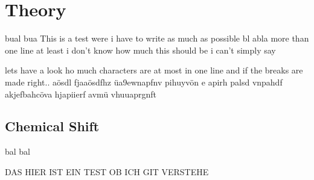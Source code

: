 \section{Theory}
bual bua This is a test were i have to write as much as possible bl abla more than one line at least i don't know how much this should be i can't simply say 

lets have a look ho much characters are at most in one line and if the breaks are made right.. aösdl fjaaösdfhz üa9ewnapfnv pihuyvön e apirh palsd vnpahdf akjefbahcöva hjapiierf avmü vhuuaprgnft 

\subsection{Chemical Shift}
bal bal 

DAS HIER IST EIN TEST OB ICH GIT VERSTEHE